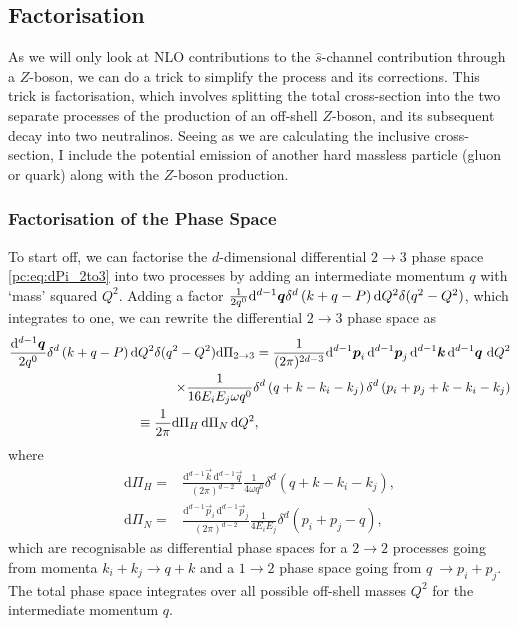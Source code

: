 \documentclass[../main.tex]{subfiles}
\begin{document}
\subsection{Factorisation}
As we will only look at NLO contributions to the \(\hat{s}\)-channel contribution through a \(Z\)-boson, we can do a trick to simplify the process and its corrections.
This trick is factorisation, which involves splitting the total cross-section into the two separate processes of the production of an off-shell \(Z\)-boson, and its subsequent decay into two neutralinos.
Seeing as we are calculating the inclusive cross-section, I include the potential emission of another hard massless particle (gluon or quark) along with the \(Z\)-boson production.

\subsubsection*{Factorisation of the Phase Space}
To start off, we can factorise the \(d\)-dimensional differential \(2\to 3\) phase space \cref{pc:eq:dPi_2to3} into two processes by adding an intermediate momentum \(q\) with `mass' squared \(Q^2\).
Adding a factor \(\frac{1}{2q^0} \mathrm{d}^{d-1}\boldsymbol{q} \delta^d\left(k+q-P\right) \mathrm{d}Q^2 \delta(q^2-Q^2)\), which integrates to one, we can rewrite the differential \(2 \to 3\) phase space as
\begin{align}
  \label{pc:eq:dPi_factorised}
  \nonumber
  \frac{\mathrm{d}^{d-1}\vec{q}}{2q^0} \delta^d\pclosed{k+q-P} \mathrm{d}Q^2 \delta(q^2-Q^2) \mathrm{d}\Pi_{2\to 3} = \frac{1}{(2\pi)^{2d-3}}\mathrm{d}^{d-1}\vec{p}_i\,\mathrm{d}^{d-1}\vec{p}_j\,\mathrm{d}^{d-1}\vec{k}\,\mathrm{d}^{d-1}\vec{q}\,\,\mathrm{d}Q^2 \\
  \nonumber
  \times \frac{1}{16E_i E_j\omega q^0} \delta^d\pclosed{q+k - k_i-k_j}\delta^d\pclosed{p_i+p_j+k - k_i-k_j}                                                                                                                                                          \\
  \equiv \frac{1}{2\pi} \mathrm{d}\Pi_H\, \mathrm{d}\Pi_N\, \mathrm{d}Q^2,\hspace{6.7cm}
\end{align}
where
\begin{subequations}
  \begin{align}
    \label{pc:eq:Pi_H}
    \mathrm{d}\Pi_H = & \frac{\mathrm{d}^{d-1}\vec{k}\, \mathrm{d}^{d-1}\vec{q}}{(2\pi)^{d-2}} \frac{1}{4\omega q^0} \delta^d(q+k-k_i-k_j), \\
    \label{pc:eq:Pi_N}
    \mathrm{d}\Pi_N = & \frac{\mathrm{d}^{d-1}\vec{p}_i\, \mathrm{d}^{d-1}\vec{p}_j}{(2\pi)^{d-2}} \frac{1}{4E_i E_j} \delta^d(p_i+p_j-q),
  \end{align}
\end{subequations}
which are recognisable as differential phase spaces for a \(2\to 2\) processes going from momenta \(k_i+k_j \to q+k\) and a \(1\to 2\) phase space going from \(q\ \to p_i+p_j\).
The total phase space integrates over all possible off-shell masses \(Q^2\) for the intermediate momentum \(q\).
\end{document}
